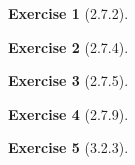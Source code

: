 \documentclass{amsart}
\theoremstyle{definition}
\newtheorem{exercise}{Exercise}
\begin{document}
\begin{exercise}[2.7.2]
\end{exercise}

\begin{exercise}[2.7.4]
\end{exercise}

\begin{exercise}[2.7.5]
\end{exercise}

\begin{exercise}[2.7.9]
\end{exercise}

\begin{exercise}[3.2.3]
\end{exercise}
\end{document}
